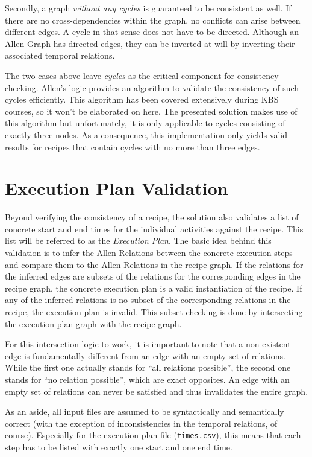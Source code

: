     Secondly, a graph \emph{without any cycles} is guaranteed to be consistent
    as well.
    If there are no cross-dependencies within the graph, no conflicts can arise between
    different edges. A cycle in that sense does not have to be directed.
    Although an Allen Graph has directed edges, they can be inverted at will by
    inverting their associated temporal relations.
    
    The two cases above leave \emph{cycles} as the critical component for
    consistency checking.
    Allen's logic provides an algorithm to validate the consistency of such
    cycles efficiently. This algorithm has been covered extensively during KBS
    courses, so it won't be elaborated on here. The presented solution makes use
    of this algorithm but unfortunately, it is only applicable to cycles
    consisting of exactly three nodes. As a consequence, this implementation
    only yields valid results for recipes that contain cycles with no more than
    three edges.
    
    \section{Execution Plan Validation}
    
    Beyond verifying the consistency of a recipe, the solution also validates a
    list of concrete start and end times for the individual activities against the
    recipe. This list will be referred to as the \emph{Execution Plan}.
    The basic idea behind this validation is to infer the Allen Relations between the
    concrete execution steps and compare them to the Allen Relations in the
    recipe graph. If the relations for the inferred edges are subsets of the
    relations for the corresponding edges in the recipe graph, the concrete
    execution plan is a valid instantiation of the recipe. If any of the
    inferred relations is no subset of the corresponding relations in the
    recipe, the execution plan is invalid. This subset-checking is done by
    intersecting the execution plan graph with the recipe graph.
    
    For this
    intersection logic to work, it is important to note that a non-existent edge
    is fundamentally different from an edge with an empty set of relations.
    While the first one actually stands for ``all relations possible'', the
    second one stands for ``no relation possible'', which are exact opposites.
    An edge with an empty set of
    relations can never be satisfied and thus invalidates the entire graph.

    As an aside, all input files are assumed to be syntactically and
    semantically correct (with the exception of inconsistencies in the temporal
    relations, of course). Especially for the execution plan file (\texttt{times.csv}),
    this means that each step has to be listed with exactly one start and one end time.